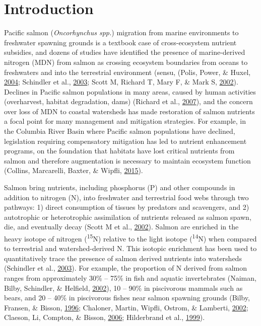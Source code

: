 \documentclass [11pt, proquest] {uwthesis}[2015/03/03]
\begin{document}
\section{Introduction}\label{introduction-1}

Pacific salmon (\emph{Oncorhynchus spp.}) migration from marine
environments to freshwater spawning grounds is a textbook case of
cross-ecosystem nutrient subsidies, and dozens of studies have
identified the presence of marine-derived nitrogen (MDN) from salmon as
crossing ecosystem boundaries from oceans to freshwaters and into the
terrestrial environment (sensu, (Polis, Power, \& Huxel,
\protect\hyperlink{ref-Polis2004}{2004}; Schindler et al.,
\protect\hyperlink{ref-Schindler2003}{2003}; Scott M, Richard T, Mary F,
\& Mark S, \protect\hyperlink{ref-Gende2002}{2002}). Declines in Pacific
salmon populations in many areas, caused by human activities
(overharvest, habitat degradation, dams) (Richard et al.,
\protect\hyperlink{ref-Gustafson2007}{2007}), and the concern over loss
of MDN to coastal watersheds has made restoration of salmon nutrients a
focal point for many management and mitigation strategies. For example,
in the Columbia River Basin where Pacific salmon populations have
declined, legislation requiring compensatory mitigation has led to
nutrient enhancement programs, on the foundation that habitats have lost
critical nutrients from salmon and therefore augmentation is necessary
to maintain ecosystem function (Collins, Marcarelli, Baxter, \& Wipfli,
\protect\hyperlink{ref-Collins2015}{2015}).

Salmon bring nutrients, including phosphorus (P) and other compounds in
addition to nitrogen (N), into freshwater and terrestrial food webs
through two pathways: 1) direct consumption of tissues by predators and
scavengers, and 2) autotrophic or heterotrophic assimilation of
nutrients released as salmon spawn, die, and eventually decay (Scott M
et al., \protect\hyperlink{ref-Gende2002}{2002}). Salmon are enriched in
the heavy isotope of nitrogen (\textsuperscript{15}N) relative to the
light isotope (\textsuperscript{14}N) when compared to terrestrial and
watershed-derived N. This isotopic enrichment has been used to
quantitatively trace the presence of salmon derived nutrients into
watersheds (Schindler et al.,
\protect\hyperlink{ref-Schindler2003}{2003}). For example, the
proportion of N derived from salmon ranges from approximately 30\% --
75\% in fish and aquatic invertebrates (Naiman, Bilby, Schindler, \&
Helfield, \protect\hyperlink{ref-Naiman2002}{2002}), 10 -- 90\% in
piscivorous mammals such as bears, and 20 -- 40\% in piscivorous fishes
near salmon spawning grounds (Bilby, Fransen, \& Bisson,
\protect\hyperlink{ref-Bilby1996}{1996}; Chaloner, Martin, Wipfli,
Ostrom, \& Lamberti, \protect\hyperlink{ref-Chaloner2002}{2002};
Claeson, Li, Compton, \& Bisson,
\protect\hyperlink{ref-Claeson2006}{2006}; Hilderbrand et al.,
\protect\hyperlink{ref-Hilderbrand1999}{1999}).
\end{document}
